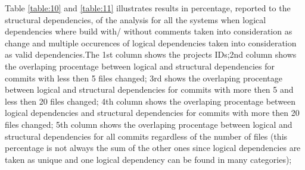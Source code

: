 \newpage

Table \ref{table:10} and \ref{table:11} illustrates results in percentage, reported to the structural dependencies, of the analysis for all the systems when logical dependencies where build with/ without comments taken into consideration as change and multiple occurences of logical dependencies taken into consideration as valid dependencies.The 1st column shows the projects IDs;2nd column shows the overlaping procentage between logical and structural dependencies for commits with less then 5 files changed; 3rd shows the overlaping procentage between logical and structural dependencies for commits with more then 5 and less then 20 files changed; 4th column shows the overlaping procentage between logical dependencies and structural dependencies for commits with more then 20 files changed; 5th column shows the overlaping procentage between logical and structural dependencies for all commits regardless of the number of files (this percentage is not always the sum of the other ones since logical dependencies are taken as unique and one logical dependency can be found in many categories);\\


